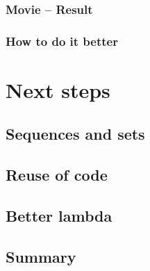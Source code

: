 \documentclass{beamer}
\begin{document}
\begin{frame}
	\frametitle{Movie -- Result}
\end{frame}

\begin{frame}
	\frametitle{How to do it better}

\end{frame}

\section{Next steps}
\subsection{Sequences and sets}
\subsection{Reuse of code}

\subsection{Better lambda}

\subsection{Summary}
\end{document}
